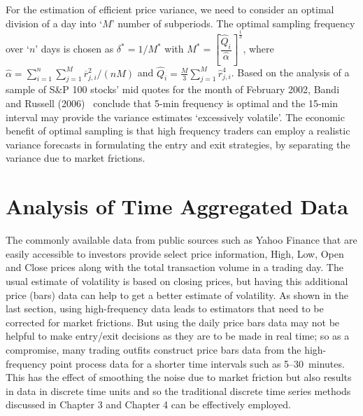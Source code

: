 For the estimation of efficient price variance, we need to consider an  optimal division of a day into `$M$' number of subperiods. The optimal sampling frequency over `$n$' days is chosen as $\delta^* = 1/M^*$ with $M^*= \left[ \dfrac{\hat{Q}_i}{\hat{\alpha}} \right]^{\frac{1}{3}}$, where $\hat{\alpha} = \sum_{i=1}^n \sum_{j=1}^M \overline{r}_{j,i}^2 / (nM)$ and $\hat{Q}_i = \frac{M}{3} \sum_{j=1}^M \hat{r}_{j,i}^4$. Based on the analysis of a sample of S\&P 100 stocks' mid quotes for the month of February 2002, Bandi and Russell (2006)~\cite{bandi} conclude that 5-min frequency is optimal and the 15-min interval may provide the variance estimates `excessively volatile'. The economic benefit of optimal sampling is that high frequency traders can employ a realistic variance forecasts in formulating the entry and exit strategies, by separating the variance due to market frictions. 




\section{Analysis of Time Aggregated Data \label{s:analysis_tad}}


The commonly available data from public sources such as Yahoo Finance that are easily accessible to investors provide select price information, High, Low, Open and Close prices along with the total transaction volume in a trading day. The usual estimate of volatility is based on closing prices, but having this additional price (bars) data can help to get a better estimate of volatility. As shown in the last section, using high-frequency data leads to estimators that need to be corrected for market frictions. But using the daily price bars data may not be helpful to make entry/exit decisions as they are to be made in real time; so as a compromise, many trading outfits construct price bars data from the high-frequency point process data for a shorter time intervals such as 5--30~minutes. This has the effect of smoothing the noise due to market friction but also results in data in discrete time units and so the traditional discrete time series methods discussed in Chapter 3 and Chapter 4 can be effectively employed. 


